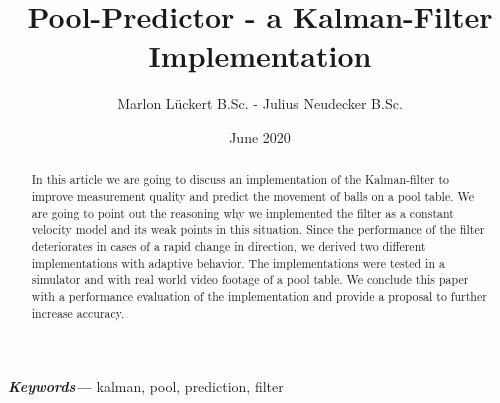 \documentclass[notitlepage, a4paper, 11pt]{scrartcl}
\providecommand{\keywords}[1]
{
  \small	
  \textbf{\textit{Keywords---}} #1
}
\begin{document}
\title{Pool-Predictor - a Kalman-Filter Implementation}
\author{Marlon Lückert B.Sc. - Julius Neudecker B.Sc.}
\date{June 2020}

\maketitle

\begin{abstract}
In this article we are going to discuss an implementation of the Kalman-filter \cite{kalman} to improve measurement quality and predict the movement of balls on a pool table. 
We are going to point out the reasoning why we implemented the filter as a constant velocity model and its weak points in this situation.
Since the performance of the filter deteriorates in cases of a rapid change in direction, we derived two different implementations with adaptive behavior.
The implementations were tested in a simulator and with real world video footage of a pool table.
We conclude this paper with a performance evaluation of the implementation and provide a proposal to further increase accuracy.

\end{abstract}

\keywords{kalman, pool, prediction, filter}
\end{document}
